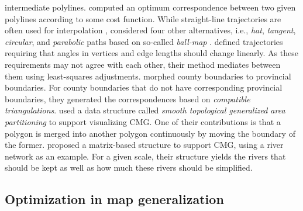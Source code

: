 \documentclass[acmsmall,natbib=false]{acmart}
\begin{document}
intermediate polylines.
\textcite{Noellenburg2008} computed an optimum
correspondence between two given polylines 
according to some cost function.
While straight-line trajectories 
are often used for interpolation
\parencite[e.g.,][]{Cecconi2003,Deng2015},
\textcite{Whited2011BallMorph} considered four other alternatives, 
i.e., \emph{hat}, \emph{tangent}, \emph{circular}, 
and \emph{parabolic} paths
based on so-called \emph{ball-map}
\parencite{Chazal2010BallMap}.
\textcite{Peng2013LSA} defined trajectories requiring that
angles in vertices and edge lengths should change linearly.
As these requirements may not agree with each other,
their method mediates between them using 
least-squares adjustments.
\textcite{Peng2016Admin} morphed county boundaries
to provincial boundaries.
For county boundaries that do not have corresponding 
provincial boundaries, they generated the correspondences based 
on \emph{compatible triangulations}.
\Textcite{vanOosterom2014tGAP} used
a data structure called
\emph{smooth topological generalized area partitioning}
to support visualizing CMG.
One of their contributions is that
a polygon is merged into another polygon continuously
by moving the boundary of the former.
\textcite{Huang2017Matrix} proposed a matrix-based structure 
to support CMG,
using a river network as an example.
For a given scale, 
their structure yields the rivers that should be kept 
as well as how much these rivers should be simplified.



\subsection{Optimization in map generalization}
\end{document}
